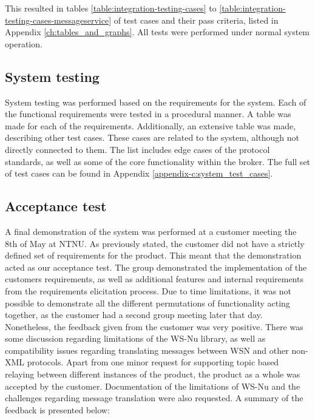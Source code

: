 This resulted in tables \ref{table:integration-testing-cases} to \ref{table:integration-testing-cases-messageservice} of test cases and their pass criteria, listed in Appendix \ref{ch:tables_and_graphs}. All tests were performed under normal system operation.

\subsection{System testing}
\label{subsec:testing-test_execution-system_testing}

System testing was performed based on the requirements for the system. Each of the functional requirements were tested in a procedural manner. A table was made for each of the requirements. Additionally, an extensive table was made, describing other test cases. These cases are related to the system, although not directly connected to them. The list includes edge cases of the protocol standards, as well as some of the core functionality within the broker. The full set of test cases can be found in Appendix \ref{appendix-c:system_test_cases}.

\subsection{Acceptance test}
\label{subsec:testing-test_execution-acceptance_test}

A final demonstration of the system was performed at a customer meeting the 8th of May at NTNU. As previously stated, the customer did not have a strictly defined set of requirements for the product. This meant that the demonstration acted as our acceptance test. The group demonstrated the implementation of the customers requirements, as well as additional features and internal requirements from the requirements elicitation process. Due to time limitations, it was not possible to demonstrate all the different permutations of functionality acting together, as the customer had a second group meeting later that day. Nonetheless, the feedback given from the customer was very positive. There was some discussion regarding limitations of the WS-Nu library, as well as compatibility issues regarding translating messages between WSN and other non-XML protocols. Apart from one minor request for supporting topic based relaying between different instances of the product, the product as a whole was accepted by the customer. Documentation of the limitations of WS-Nu and the challenges regarding message translation were also requested. A summary of the feedback is presented below:

